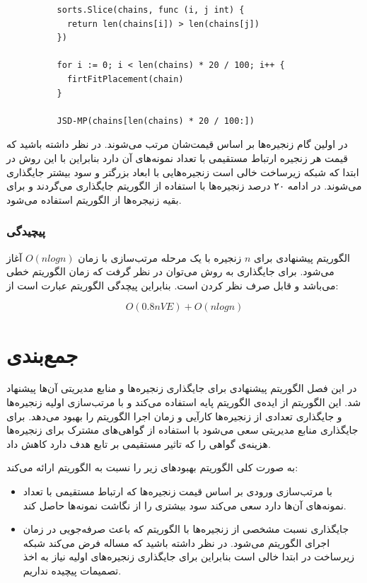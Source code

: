 \begin{latin}
    \begin{verbatim}
          sorts.Slice(chains, func (i, j int) {
            return len(chains[i]) > len(chains[j])
          })

          for i := 0; i < len(chains) * 20 / 100; i++ {
            firtFitPlacement(chain)
          }

          JSD-MP(chains[len(chains) * 20 / 100:])
    \end{verbatim}
\end{latin}

در اولین گام زنجیره‌ها بر اساس قیمت‌شان مرتب می‌شوند.
در نظر داشته باشید که قیمت هر زنجیره ارتباط مستقیمی با تعداد نمونه‌های آن دارد
بنابراین با این روش در ابتدا که شبکه زیرساخت خالی است زنجیره‌هایی با ابعاد بزرگتر و سود بیشتر جایگذاری می‌شوند.
در ادامه ۲۰ درصد زنجیره‌ها با استفاده از الگوریتم 
جایگذاری می‌گردند و برای بقیه زنیجره‌ها از الگوریتم 
استفاده می‌شود.

\subsubsection{پیچیدگی}

الگوریتم پیشنهادی برای \(n\) زنجیره با یک مرحله مرتب‌سازی با زمان \(O(nlogn)\) آغاز می‌شود.
برای جایگذاری به روش  می‌توان در نظر گرفت که زمان الگوریتم خطی می‌باشد و قابل صرف نظر کردن است.
بنابراین پیچدگی الگوریتم عبارت است از:

$$
O(0.8nVE) + O(nlogn)
$$

\section{جمع‌بندی}

در این فصل الگوریتم پیشنهادی برای جایگذاری زنجیره‌ها و منابع مدیریتی آن‌ها پیشنهاد شد.
این الگوریتم از ایده‌ی الگوریتم \cite{Bari2015}
پایه استفاده می‌کند و با مرتب‌سازی اولیه زنجیره‌ها
و جایگذاری 
تعدادی از زنجیره‌ها کارآیی و زمان اجرا الگوریتم را بهبود می‌دهد.
برای جایگذاری منابع مدیریتی سعی می‌شود با استفاده از گواهی‌های مشترک برای زنجیره‌ها
هزینه‌ی گواهی را که تاثیر مستقیمی بر تابع هدف دارد کاهش داد.

به صورت کلی الگوریتم  بهبودهای زیر را نسبت به الگوریتم  ارائه می‌کند:

\begin{itemize}
  \item
  با مرتب‌سازی ورودی بر اساس قیمت زنجیره‌ها که ارتباط مستقیمی با تعداد نمونه‌های آن‌ها دارد
  سعی می‌کند سود بیشتری را از نگاشت نمونه‌ها حاصل کند.
  \item
  جایگذاری نسبت مشخصی از زنجیره‌ها با الگوریتم  که باعث صرفه‌جویی در زمان اجرای الگوریتم می‌شود.
  در نظر داشته باشید که مساله فرض می‌کند شبکه زیرساخت در ابتدا خالی است بنابراین برای جایگذاری زنجیره‌های اولیه نیاز به اخذ تصمیمات پیچیده نداریم.
\end{itemize}